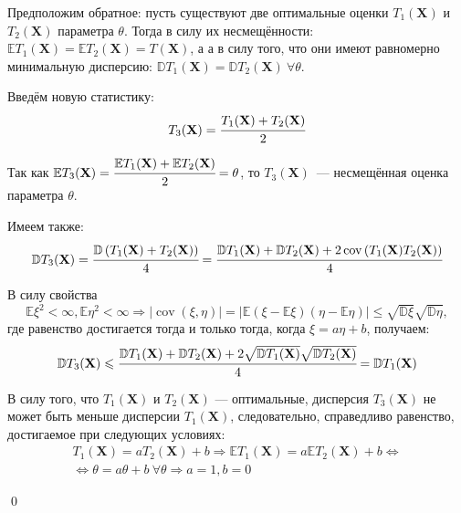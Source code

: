 \documentclass[oneside,final,14pt]{extreport}
\renewenvironment{proof}{{\bfseries Доказательство.}}{\qed}
\theoremstyle{plain}
\theoremstyle{definition}
\theoremstyle{named}
\begin{document}
\begin{proof}
Предположим обратное: пусть существуют две оптимальные оценки $T_1(\mathbf{X})$ и $T_2(\mathbf{X})$ параметра $\theta$. Тогда в силу их несмещённости: $\mathbb{E} T_{1}(\mathbf{X})=\mathbb{E} T_{2}(\mathbf{X})=T(\mathbf{X})$, а а в силу того, что они имеют равномерно минимальную дисперсию: $\mathbb{D} T_{1}(\mathbf{X})=\mathbb{D} T_{2}(\mathbf{X})~ \forall \theta$.

Введём новую статистику: 
\begin{equation}
    T_{3}(\mathbf{X})=\cfrac{T_{1}(\mathbf{X})+T_{2}(\mathbf{X})}{2}
\end{equation}

Так как $\mathbb{E} T_{3}(\mathbf{X})=\cfrac{\mathbb{E} T_{1}(\mathbf{X})+\mathbb{E} T_{2}(\mathbf{X})}{2}=\theta$, то $T_{3}(\mathbf{X})$~--- несмещённая оценка параметра $\theta$.

Имеем также:
\begin{equation*}
    \mathbb{D} T_{3}(\mathbf{X})=\cfrac{\mathbb{D}\left(T_{1}(\mathbf{X})+T_{2}(\mathbf{X})\right)}{4} =
    \cfrac{\mathbb{D} T_{1}(\mathbf{X})+\mathbb{D} T_{2}(\mathbf{X})+2 \operatorname{cov}\left(T_{1}(\mathbf{X}) T_{2}(\mathbf{X})\right)}{4}
\end{equation*}

В силу свойства
\begin{equation*}
    \mathbb{E} \xi^{2}<\infty, \mathbb{E} \eta^{2}<\infty \Rightarrow|\operatorname{cov}(\xi, \eta)| = | \mathbb{E}(\xi-\mathbb{E} \xi)(\eta-\mathbb{E} \eta)| \leqslant \sqrt{\mathbb{D} \xi} \sqrt{\mathbb{D} \eta},
\end{equation*}
где равенство достигается тогда и только тогда, когда $\xi=a \eta+b$, получаем:
\begin{equation*}
    \mathbb{D} T_{3}(\mathbf{X}) \leqslant \cfrac{\mathbb{D} T_{1}(\mathbf{X})+\mathbb{D} T_{2}(\mathbf{X})+2 \sqrt{\mathbb{D} T_{1}(\mathbf{X})} \sqrt{\mathbb{D} T_{2}(\mathbf{X})}}{4} =\mathbb{D} T_{1}(\mathbf{X})
\end{equation*}

В силу того, что $T_1(\mathbf{X})$ и $T_2(\mathbf{X})$ — оптимальные, дисперсия $T_3(\mathbf{X})$ не может быть меньше дисперсии $T_1(\mathbf{X})$, следовательно, справедливо равенство, достигаемое при следующих условиях:
\begin{equation*}
\begin{aligned}
    T_{1}(\mathbf{X})=a T_{2}(\mathbf{X})+b \Rightarrow \mathbb{E} T_{1}(\mathbf{X})
    = a \mathbb{E} T_{2}(\mathbf{X})+b 
    \Leftrightarrow \\
    \Leftrightarrow \theta = a \theta + b~ \forall \theta \Rightarrow a = 1, b = 0
\end{aligned}
\end{equation*}

\end{proof}
\end{document}
